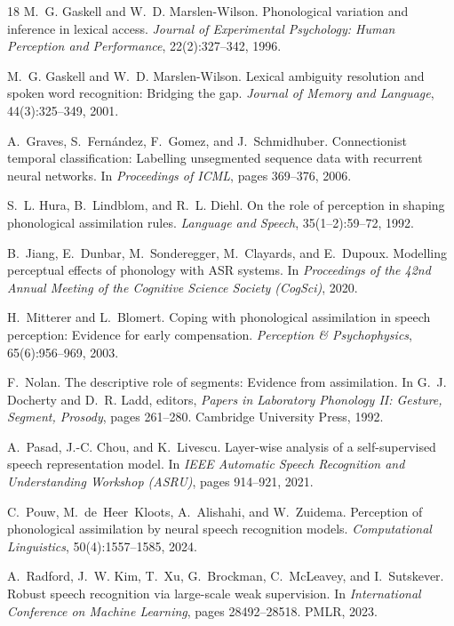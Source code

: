 \documentclass[11pt,a4paper]{article}
\begin{document}
\begin{thebibliography}{18}
M.~G. Gaskell and W.~D. Marslen-Wilson.
\newblock Phonological variation and inference in lexical access.
\newblock \emph{Journal of Experimental Psychology: Human Perception and
  Performance}, 22(2):327--342, 1996.

M.~G. Gaskell and W.~D. Marslen-Wilson.
\newblock Lexical ambiguity resolution and spoken word recognition:
  Bridging the gap.
\newblock \emph{Journal of Memory and Language}, 44(3):325--349, 2001.

A.~Graves, S.~Fern\'andez, F.~Gomez, and J.~Schmidhuber.
\newblock Connectionist temporal classification: Labelling unsegmented
  sequence data with recurrent neural networks.
\newblock In \emph{Proceedings of ICML}, pages 369--376, 2006.

S.~L. Hura, B.~Lindblom, and R.~L. Diehl.
\newblock On the role of perception in shaping phonological assimilation
  rules.
\newblock \emph{Language and Speech}, 35(1--2):59--72, 1992.

B.~Jiang, E.~Dunbar, M.~Sonderegger, M.~Clayards, and E.~Dupoux.
\newblock Modelling perceptual effects of phonology with {ASR} systems.
\newblock In \emph{Proceedings of the 42nd Annual Meeting of the Cognitive
  Science Society (CogSci)}, 2020.

H.~Mitterer and L.~Blomert.
\newblock Coping with phonological assimilation in speech perception:
  Evidence for early compensation.
\newblock \emph{Perception \& Psychophysics}, 65(6):956--969, 2003.

F.~Nolan.
\newblock The descriptive role of segments: Evidence from assimilation.
\newblock In G.~J. Docherty and D.~R. Ladd, editors, \emph{Papers in
  Laboratory Phonology II: Gesture, Segment, Prosody}, pages 261--280.
  Cambridge University Press, 1992.

A.~Pasad, J.-C. Chou, and K.~Livescu.
\newblock Layer-wise analysis of a self-supervised speech representation
  model.
\newblock In \emph{IEEE Automatic Speech Recognition and Understanding
  Workshop (ASRU)}, pages 914--921, 2021.

C.~Pouw, M.~de~Heer~Kloots, A.~Alishahi, and W.~Zuidema.
\newblock Perception of phonological assimilation by neural speech
  recognition models.
\newblock \emph{Computational Linguistics}, 50(4):1557--1585, 2024.

A.~Radford, J.~W. Kim, T.~Xu, G.~Brockman, C.~McLeavey, and
  I.~Sutskever.
\newblock Robust speech recognition via large-scale weak supervision.
\newblock In \emph{International Conference on Machine Learning}, pages
  28492--28518. PMLR, 2023.

\end{thebibliography}

\end{document}
